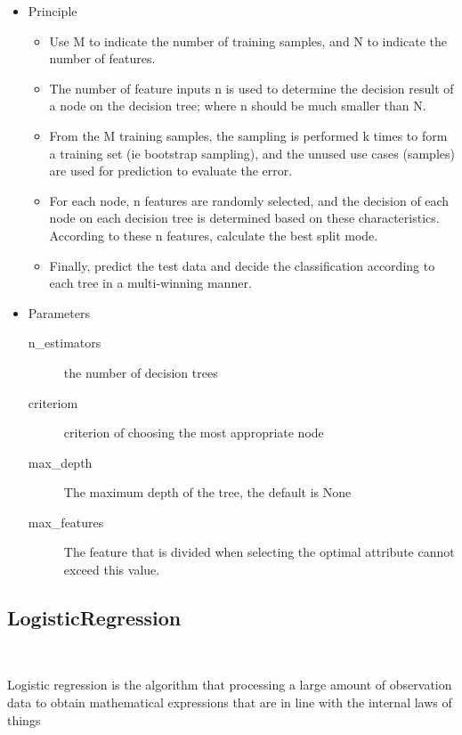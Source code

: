 \begin{itemize}
	\item Principle
	
	\begin{itemize}
		\item Use M to indicate the number of training samples, 
		and N to indicate the number of features.
		\item The number of feature inputs n is 
		used to determine the decision result 
		of a node on the decision tree; 
		where n should be much smaller than N.
		\item From the M training samples, 
		the sampling is performed k times to 
		form a training set (ie bootstrap sampling), 
		and the unused use cases (samples) are 
		used for prediction to evaluate the error.
		\item For each node, 
		n features are randomly selected, 
		and the decision of each node on each decision tree is 
		determined based on these characteristics. 
		According to these n features, 
		calculate the best split mode.
		\item Finally, predict the test data and 
		decide the classification 
		according to each tree in a multi-winning manner.
	\end{itemize}
	
	\item Parameters
	
	\begin{description}
		\item[n_estimators] the number of decision trees
		\item[criteriom] criterion of choosing 
		the most appropriate node
		\item[max_depth] The maximum depth of the tree, 
		the default is None 
		\item[max_features] The feature that is divided 
		when selecting the optimal attribute 
		cannot exceed this value.
	\end{description}

\end{itemize}


\subsection{LogisticRegression}
\

Logistic regression is the algorithm that 
processing a large amount of 
observation data to 
obtain mathematical expressions 
that are in line with 
the internal laws of things

